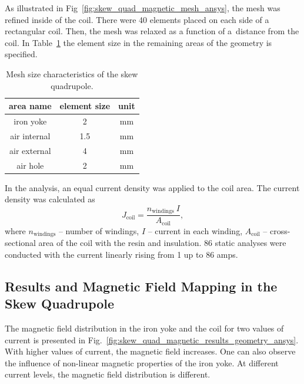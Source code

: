 As illustrated in Fig~\ref{fig:skew_quad_magnetic_mesh_ansys}, the mesh was refined inside of the coil. There were 40 elements placed on each side of a rectangular coil. Then, the mesh was relaxed as a function of a~distance from the coil. In Table~\ref{table:mesh_characteristics_magnetic_ansys} the element size in the remaining
areas of the geometry is specified.

\begin{table}[H]
    \caption{Mesh size characteristics of the skew quadrupole.} 
    \vspace{-1.em} 
    \fontsize{10}{10}
    \selectfont 
    \renewcommand{\arraystretch}{1.5}
    \begin{center}
        \begin{tabular}{ ccc } 
        \hline
        area name & element size & unit \\
        \hline
        iron yoke & 2 & mm \\
        air internal & 1.5 & mm \\
        air external & 4 & mm \\
        air hole & 2 & mm \\
        \hline 
        \end{tabular}
    \end{center}  
     \label{table:mesh_characteristics_magnetic_ansys} 
\end{table}

In the analysis, an equal current density was applied to the coil area. The current density was calculated as
\begin{equation}
    J_\text{coil} = \frac{n_\text{windings}~I}{A_\text{coil}},
\end{equation}
where $n_\text{windings}$ -- number of windings, $I$ -- current in each winding, $A_\text{coil}$ -- cross-sectional area of the coil with the resin and insulation. 86 static analyses were conducted with the current linearly rising from 1 up to 86 amps. 

\subsection{Results and Magnetic Field Mapping in the Skew Quadrupole}

The magnetic field distribution in the iron yoke and the coil for two values of current is presented in Fig.~\ref{fig:skew_quad_magnetic_results_geometry_ansys}. With higher values of current, the magnetic field increases. One can also observe the influence of non-linear magnetic properties of the iron yoke. At different current levels, the magnetic field distribution is different.

